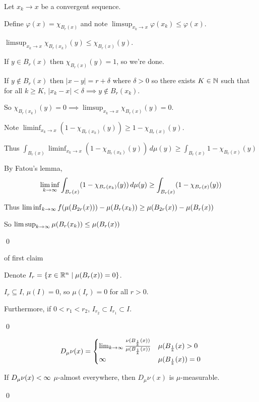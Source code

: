 \documentclass[x11names,reqno,14pt]{extarticle}
\begin{document}
Let $x_k \to x$ be a convergent sequence. 

Define $\varphi(x) = \chi_{B_r(x)}$ and note $\limsup_{x_k\to x}\varphi(x_k) \leq\varphi(x)$. 

$\limsup_{x_k\to x}\chi_{B_r(x_k)}(y) \leq \chi_{B_r(x)}(y)$. 

If $y\in B_r(x)$ then $\chi_{B_r(x)}(y) = 1$, so we're done. 

If $y\not\in B_r(x)$ then $|x - y| = r + \delta$ where $\delta > 0$ so there exists $K \in \mathbb{N}$ such that for all $k \geq K$, $|x_k - x| < \delta \implies y\not\in B_r(x_k)$. 

So $\chi_{B_r(x_k)}(y) = 0 \implies \limsup_{x_k\to x}\chi_{B_r(x)}(y) = 0$. 

Note $\liminf_{x_k\to x}(1 - \chi_{B_r(x_k)}(y)) \geq 1 - \chi_{B_r(x)}(y)$. 

Thus $\int_{B_r(x)}\liminf_{x_k\to x}(1 - \chi_{B_r(x_k)}(y))\,d\mu(y) \geq \int_{B_r(x)}1 - \chi_{B_r(x)}(y)$

By Fatou's lemma, 
\[
\liminf_{k\to\infty}\int_{B_r(x)}(1 - \chi_{B_r(x_k)}(y))\,d\mu(y) \geq \int_{B_r(x)}(1 - \chi_{B_r(x)}(y))
\]

Thus $\liminf_{k\to\infty} f(\mu(B_{2r}(x))) - \mu(B_r(x_k)) \geq \mu(B_{2r}(x)) - \mu(B_r(x))$

So $\limsup_{k\to\infty}\mu(B_r(x_k)) \leq \mu(B_r(x))$

\qed

\proof of first claim

Denote $I_r = \{x\in\mathbb{R}^n \mid \mu(B_r(x)) = 0 \}$. 

$I_r \subseteq I$, $\mu(I) = 0$, so $\mu(I_r) = 0$ for all $r > 0$. 

Furthermore, if $0 < r_1 < r_2$, $I_{r_2} \subset I_{r_1} \subset I$. 

\qed

\claim

\[
D_\mu\nu(x) = 
\begin{cases}
\lim_{k\to\infty}\frac{\nu(B_{\frac{1}{k}}(x))}{\mu(B_{\frac{1}{k}}(x))} & \mu(B_{\frac{1}{k}}(x) > 0 \\ 
\infty & \mu(B_{\frac{1}{k}}(x)) = 0 \\
\end{cases}
\] 

If $D_\mu\nu(x)<\infty$ $\mu$-almost everywhere, then $D_\mu\nu(x)$ is $\mu$-measurable. 

\proof

\qed

\end{document}
